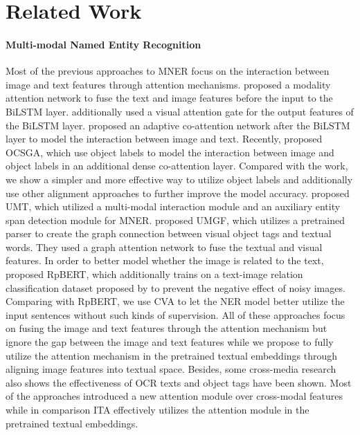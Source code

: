 \documentclass[11pt]{article}
\begin{document}
\section{Related Work}



\paragraph{Multi-modal Named Entity Recognition} 
Most of the previous approaches to MNER focus on the interaction between image and text features through attention mechanisms. \citet{moon-etal-2018-multimodal} proposed a modality attention network to fuse the text and image features before the input to the BiLSTM layer. \citet{lu-etal-2018-visual} additionally used a visual attention gate for the output features of the BiLSTM layer. \citet{zhang2018adaptive} proposed an adaptive co-attention network after the BiLSTM layer to model the interaction between image and text. Recently, \citet{10.1145/3394171.3413650} proposed OCSGA, which use object labels to model the interaction between image and object labels in an additional dense co-attention layer.
Compared with the work, we show a simpler and more effective way to utilize object labels and additionally use other alignment approaches to further improve the model accuracy. \citet{yu-etal-2020-improving-multimodal} proposed UMT, which utilized a multi-modal interaction module and an auxiliary entity span detection module for MNER. \citet{zhang2021multi} proposed UMGF, which utilizes a pretrained parser to create the graph connection between visual object tags and textual words. They used a graph attention network to fuse the textual and visual features. In order to better model whether the image is related to the text, \citet{Sun2021RpBERTAT} proposed RpBERT, which additionally trains on a text-image relation classification dataset proposed by \citet{vempala-preotiuc-pietro-2019-categorizing} to prevent the negative effect of noisy images. Comparing with RpBERT, we use CVA to let the NER model better utilize the input sentences without such kinds of supervision. All of these approaches focus on fusing the image and text features through the attention mechanism but ignore the gap between the image and text features while we propose to fully utilize the attention mechanism in the pretrained textual embeddings through aligning image features into textual space. Besides, some cross-media research also shows the effectiveness of OCR texts \citep{chen2016context,wang-etal-2020-cross-media} and object tags \citep{7780398} have been shown. Most of the approaches introduced a new attention module over cross-modal features while in comparison ITA effectively utilizes the attention module in the pretrained textual embeddings.
\end{document}
